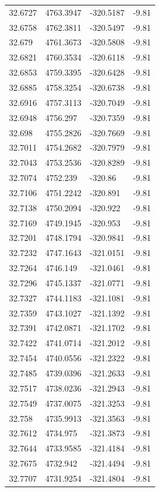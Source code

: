 \begin{table}[H]
\begin{tabular}{llll}
32.6727 & 4763.3947 & -320.5187 & -9.81 \\
32.6758 & 4762.3811 & -320.5497 & -9.81 \\
32.679 & 4761.3673 & -320.5808 & -9.81 \\
32.6821 & 4760.3534 & -320.6118 & -9.81 \\
32.6853 & 4759.3395 & -320.6428 & -9.81 \\
32.6885 & 4758.3254 & -320.6738 & -9.81 \\
32.6916 & 4757.3113 & -320.7049 & -9.81 \\
32.6948 & 4756.297 & -320.7359 & -9.81 \\
32.698 & 4755.2826 & -320.7669 & -9.81 \\
32.7011 & 4754.2682 & -320.7979 & -9.81 \\
32.7043 & 4753.2536 & -320.8289 & -9.81 \\
32.7074 & 4752.239 & -320.86 & -9.81 \\
32.7106 & 4751.2242 & -320.891 & -9.81 \\
32.7138 & 4750.2094 & -320.922 & -9.81 \\
32.7169 & 4749.1945 & -320.953 & -9.81 \\
32.7201 & 4748.1794 & -320.9841 & -9.81 \\
32.7232 & 4747.1643 & -321.0151 & -9.81 \\
32.7264 & 4746.149 & -321.0461 & -9.81 \\
32.7296 & 4745.1337 & -321.0771 & -9.81 \\
32.7327 & 4744.1183 & -321.1081 & -9.81 \\
32.7359 & 4743.1027 & -321.1392 & -9.81 \\
32.7391 & 4742.0871 & -321.1702 & -9.81 \\
32.7422 & 4741.0714 & -321.2012 & -9.81 \\
32.7454 & 4740.0556 & -321.2322 & -9.81 \\
32.7485 & 4739.0396 & -321.2633 & -9.81 \\
32.7517 & 4738.0236 & -321.2943 & -9.81 \\
32.7549 & 4737.0075 & -321.3253 & -9.81 \\
32.758 & 4735.9913 & -321.3563 & -9.81 \\
32.7612 & 4734.975 & -321.3873 & -9.81 \\
32.7644 & 4733.9585 & -321.4184 & -9.81 \\
32.7675 & 4732.942 & -321.4494 & -9.81 \\
32.7707 & 4731.9254 & -321.4804 & -9.81 \\

\end{tabular}
\end{table}
